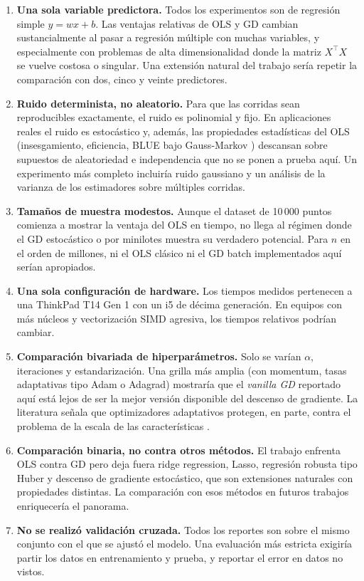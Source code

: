 \documentclass[11pt,a4paper]{article}
\begin{document}
\begin{enumerate}
    \item \textbf{Una sola variable predictora.} Todos los experimentos son de regresión simple $y = wx + b$. Las ventajas relativas de OLS y GD cambian sustancialmente al pasar a regresión múltiple con muchas variables, y especialmente con problemas de alta dimensionalidad donde la matriz $X^{\top}X$ se vuelve costosa o singular. Una extensión natural del trabajo sería repetir la comparación con dos, cinco y veinte predictores.
    \item \textbf{Ruido determinista, no aleatorio.} Para que las corridas sean reproducibles exactamente, el ruido es polinomial y fijo. En aplicaciones reales el ruido es estocástico y, además, las propiedades estadísticas del OLS (insesgamiento, eficiencia, BLUE bajo Gauss-Markov \cite{wiki_mco,esri_ols}) descansan sobre supuestos de aleatoriedad e independencia que no se ponen a prueba aquí. Un experimento más completo incluiría ruido gaussiano y un análisis de la varianza de los estimadores sobre múltiples corridas.
    \item \textbf{Tamaños de muestra modestos.} Aunque el dataset de 10\,000 puntos comienza a mostrar la ventaja del OLS en tiempo, no llega al régimen donde el GD estocástico o por minilotes muestra su verdadero potencial. Para $n$ en el orden de millones, ni el OLS clásico ni el GD batch implementados aquí serían apropiados.
    \item \textbf{Una sola configuración de hardware.} Los tiempos medidos pertenecen a una ThinkPad T14 Gen 1 con un i5 de décima generación. En equipos con más núcleos y vectorización SIMD agresiva, los tiempos relativos podrían cambiar.
    \item \textbf{Comparación bivariada de hiperparámetros.} Solo se varían $\alpha$, iteraciones y estandarización. Una grilla más amplia (con momentum, tasas adaptativas tipo Adam o Adagrad) mostraría que el \textit{vanilla GD} reportado aquí está lejos de ser la mejor versión disponible del descenso de gradiente. La literatura señala que optimizadores adaptativos protegen, en parte, contra el problema de la escala de las características \cite{google_norm}.
    \item \textbf{Comparación binaria, no contra otros métodos.} El trabajo enfrenta OLS contra GD pero deja fuera ridge regression, Lasso, regresión robusta tipo Huber y descenso de gradiente estocástico, que son extensiones naturales con propiedades distintas. La comparación con esos métodos en futuros trabajos enriquecería el panorama.
    \item \textbf{No se realizó validación cruzada.} Todos los reportes son sobre el mismo conjunto con el que se ajustó el modelo. Una evaluación más estricta exigiría partir los datos en entrenamiento y prueba, y reportar el error en datos no vistos.
\end{enumerate}
\end{document}
